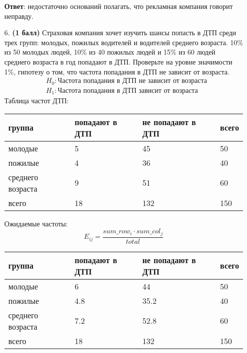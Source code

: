 \documentclass{assignment}
\begin{document}
\begin{enumerate}
    \textbf{Ответ}: недостаточно оснований полагать, что рекламная компания говорит неправду.
    \finish

    \item[6.] \textbf{(1 балл)} Страховая компания хочет изучить шансы попасть в ДТП среди трех групп: молодых, пожилых водителей и водителей среднего возраста. 10\% из 50 молодых людей, 10\% из 40 пожилых людей и 15\% из 60 людей среднего возраста в год попадают в ДТП. Проверьте на уровне значимости 1\%, гипотезу о том, что частота попадания в ДТП не зависит от возраста.
    \start
    \begin{align*}
        &H_0: \text{Частота попадания в ДТП не зависит от возраста} \\
        &H_1: \text{Частота попадания в ДТП зависит от возраста}
    \end{align*}
    Таблица частот ДТП:
    \begin{table}[h!]
        \begin{tabular}{|l|l|l|l|}
        \hline
        группа            & попадают в ДТП & не попадают в ДТП & всего \\ \hline
        молодые           & 5              & 45                & 50    \\ \hline
        пожилые           & 4              & 36                & 40    \\ \hline
        среднего возраста & 9              & 51                & 60    \\ \hline
        всего             & 18             & 132               & 150   \\ \hline
        \end{tabular}
    \end{table}
    
    Ожидаемые частоты:
    \begin{equation}
        E_{ij} = \frac{sum\_row_i\cdot sum\_col_j}{total}
    \end{equation}
    \begin{table}[h!]
        \begin{tabular}{|l|l|l|l|}
        \hline
        группа            & попадают в ДТП & не попадают в ДТП & всего \\ \hline
        молодые           & 6              & 44                & 50    \\ \hline
        пожилые           & 4.8              & 35.2                & 40    \\ \hline
        среднего возраста & 7.2              & 52.8                & 60    \\ \hline
        всего             & 18             & 132               & 150   \\ \hline
        \end{tabular}
    \end{table}
    

\end{enumerate}
\end{document}
